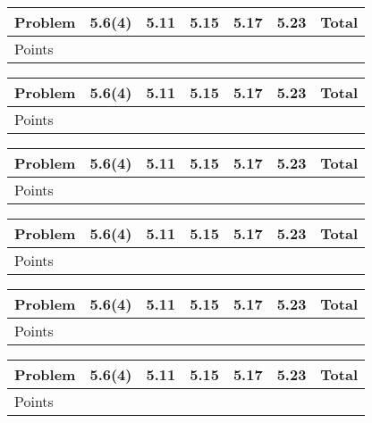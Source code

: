 \documentclass{fkletter}
\begin{document}
\begin{table}[H]
  \centering
  \begin{tabular}{lcccccr} \toprule
    Problem & 5.6(4) & 5.11 & 5.15 & 5.17 & 5.23 & Total \\
    \midrule
    Points & \\\bottomrule
  \end{tabular}
\end{table}
\begin{table}[H]
  \centering
  \begin{tabular}{lcccccr} \toprule
    Problem & 5.6(4) & 5.11 & 5.15 & 5.17 & 5.23 & Total \\
    \midrule
    Points & \\\bottomrule
  \end{tabular}
\end{table}
\begin{table}[H]
  \centering
  \begin{tabular}{lcccccr} \toprule
    Problem & 5.6(4) & 5.11 & 5.15 & 5.17 & 5.23 & Total \\
    \midrule
    Points & \\\bottomrule
  \end{tabular}
\end{table}
\begin{table}[H]
  \centering
  \begin{tabular}{lcccccr} \toprule
    Problem & 5.6(4) & 5.11 & 5.15 & 5.17 & 5.23 & Total \\
    \midrule
    Points & \\\bottomrule
  \end{tabular}
\end{table}
\begin{table}[H]
  \centering
  \begin{tabular}{lcccccr} \toprule
    Problem & 5.6(4) & 5.11 & 5.15 & 5.17 & 5.23 & Total \\
    \midrule
    Points & \\\bottomrule
  \end{tabular}
\end{table}
\begin{table}[H]
  \centering
  \begin{tabular}{lcccccr} \toprule
    Problem & 5.6(4) & 5.11 & 5.15 & 5.17 & 5.23 & Total \\
    \midrule
    Points & \\\bottomrule
  \end{tabular}
\end{table}
\end{document}
